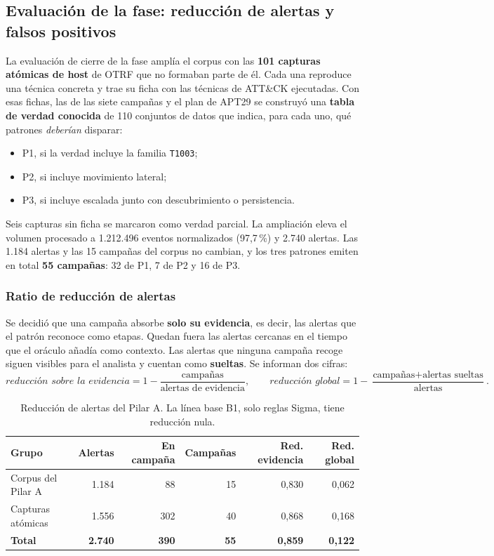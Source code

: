\subsection{Evaluación de la fase: reducción de alertas y falsos positivos}
\label{sec:pilarA-evaluacion}

La evaluación de cierre de la fase amplía el corpus con las \textbf{101 capturas atómicas
de host} de OTRF que no formaban parte de él. Cada una reproduce una técnica concreta y trae
su ficha con las técnicas de ATT\&CK ejecutadas. Con esas fichas, las de las siete campañas
y el plan de APT29 se construyó una \textbf{tabla de verdad conocida} de 110 conjuntos de
datos que indica, para cada uno, qué patrones \emph{deberían} disparar:
\begin{itemize}
    \item P1, si la verdad incluye la familia \texttt{T1003};
    \item P2, si incluye movimiento lateral;
    \item P3, si incluye escalada junto con descubrimiento o persistencia.
\end{itemize}
Seis capturas sin ficha se marcaron como verdad parcial. La ampliación eleva el volumen
procesado a 1.212.496 eventos normalizados (97,7\,\%) y 2.740 alertas. Las 1.184 alertas y
las 15 campañas del corpus no cambian, y los tres patrones emiten en total \textbf{55
campañas}: 32 de P1, 7 de P2 y 16 de P3.

\subsubsection{Ratio de reducción de alertas}

Se decidió que una campaña absorbe \textbf{solo su evidencia}, es decir, las alertas que el
patrón reconoce como etapas. Quedan fuera las alertas cercanas en el tiempo que el oráculo
añadía como contexto. Las alertas que ninguna campaña recoge siguen visibles para el
analista y cuentan como \textbf{sueltas}. Se informan dos cifras:
\[
\textit{reducción sobre la evidencia} = 1 - \frac{\text{campañas}}{\text{alertas de evidencia}},
\qquad
\textit{reducción global} = 1 - \frac{\text{campañas} + \text{alertas sueltas}}{\text{alertas}}.
\]

\begin{table}[H]
\centering
\small
\begin{tabular}{|l|r|r|r|r|r|}
\hline
\textbf{Grupo} & \textbf{Alertas} & \textbf{En campaña} & \textbf{Campañas} &
\textbf{Red. evidencia} & \textbf{Red. global} \\
\hline
Corpus del Pilar A & 1.184 & 88 & 15 & 0,830 & 0,062 \\
Capturas atómicas & 1.556 & 302 & 40 & 0,868 & 0,168 \\
\hline
\textbf{Total} & \textbf{2.740} & \textbf{390} & \textbf{55} & \textbf{0,859} & \textbf{0,122} \\
\hline
\end{tabular}
\caption{Reducción de alertas del Pilar A. La línea base B1, solo reglas Sigma, tiene
reducción nula.}
\label{tab:reduccion-pilarA}
\end{table}

